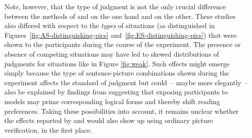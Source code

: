 \documentclass[fleqn,reqno,10pt,draft]{article}
\begin{document}
Note, however, that the type of judgment is not the only crucial
difference between the methods of
\citeauthor{CliftonDube2010:Embedded-Implic} and
\citeauthor{ChemlaSpector2010:Experimental-Ev} on the one hand and
\citet{GeurtsPouscoulous2009:Embedded-Implic} on the other. These
studies also differed with respect to the \emph{types} of situations
(as distinguished in Figures~\ref{fig:AS-distinguishing-pics}
and~\ref{fig:ES-distinguishing-pics}) that were shown to the
participants during the course of the experiment. The presence or
absence of competing situations may have led to skewed distributions
of judgments for situations like in Figure \ref{fig:weak}. Such
effects might emerge simply because the type of sentence-picture
combinations shown during the experiment affects the standard of
judgment but could~-- maybe more elegantly~-- also be explained by
findings from \citet{Raffray2010} suggesting that exposing
participants to models may prime corresponding logical forms and
thereby shift reading preferences. Taking these possibilities into
account, it remains unclear whether the effects reported by
\citeauthor{CliftonDube2010:Embedded-Implic} and
\citeauthor{ChemlaSpector2010:Experimental-Ev} would also show up
using ordinary picture verification, in the first place.
\end{document}

